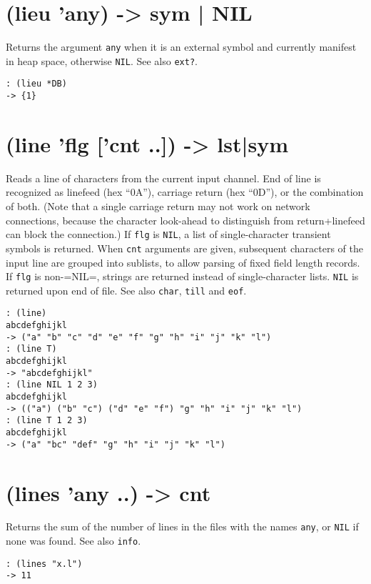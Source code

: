 {{{{{{ 
\section{(lieu 'any) -> sym | NIL}
\label{sec-8-1-12-12}


Returns the argument \texttt{any} when it is an external symbol and currently
manifest in heap space, otherwise \texttt{NIL}. See also \texttt{ext?}.


\begin{verbatim}
: (lieu *DB)
-> {1}
\end{verbatim}

 
\section{(line 'flg ['cnt ..]) -> lst|sym}
\label{sec-8-1-12-13}


Reads a line of characters from the current input channel. End of line
is recognized as linefeed (hex ``0A''), carriage return (hex ``0D''), or the
combination of both. (Note that a single carriage return may not work on
network connections, because the character look-ahead to distinguish
from return+linefeed can block the connection.) If \texttt{flg} is \texttt{NIL}, a
list of single-character transient symbols is returned. When \texttt{cnt}
arguments are given, subsequent characters of the input line are grouped
into sublists, to allow parsing of fixed field length records. If \texttt{flg}
is non-=NIL=, strings are returned instead of single-character lists.
\texttt{NIL} is returned upon end of file. See also \texttt{char}, \texttt{till} and \texttt{eof}.


\begin{verbatim}
: (line)
abcdefghijkl
-> ("a" "b" "c" "d" "e" "f" "g" "h" "i" "j" "k" "l")
: (line T)
abcdefghijkl
-> "abcdefghijkl"
: (line NIL 1 2 3)
abcdefghijkl
-> (("a") ("b" "c") ("d" "e" "f") "g" "h" "i" "j" "k" "l")
: (line T 1 2 3)
abcdefghijkl
-> ("a" "bc" "def" "g" "h" "i" "j" "k" "l")
\end{verbatim}

 
\section{(lines 'any ..) -> cnt}
\label{sec-8-1-12-14}


Returns the sum of the number of lines in the files with the names
\texttt{any}, or \texttt{NIL} if none was found. See also \texttt{info}.


\begin{verbatim}
: (lines "x.l")
-> 11
\end{verbatim}

}}}}}}
